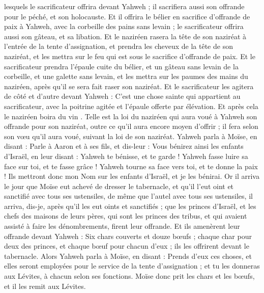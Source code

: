 \begin{multicols}{2}
lesquels le sacrificateur offrira devant Yahweh ; il sacrifiera aussi son offrande pour le péché, et son holocauste.
Et il offrira le bélier en sacrifice d'offrande de paix à Yahweh, avec la corbeille des pains sans levain ; le sacrificateur offrira aussi son gâteau, et sa libation.
Et le naziréen rasera la tête de son naziréat à l'entrée de la tente d'assignation, et prendra les cheveux de la tête de son naziréat, et les mettra sur le feu qui est sous le sacrifice d'offrande de paix.
Et le sacrificateur prendra l'épaule cuite du bélier, et un gâteau sans levain de la corbeille, et une galette sans levain, et les mettra sur les paumes des mains du naziréen, après qu'il se sera fait raser son naziréat.
Et le sacrificateur les agitera de côté et d'autre devant Yahweh : C'est une chose sainte qui appartient au sacrificateur, avec la poitrine agitée et l'épaule offerte par élévation. Et après cela le naziréen boira du vin
.
Telle est la loi du naziréen qui aura voué à Yahweh son offrande pour son naziréat, outre ce qu'il aura encore moyen d'offrir ; il fera selon son vœu qu'il aura voué, suivant la loi de son naziréat.
Yahweh parla à Moïse, en disant :
Parle à Aaron et à ses fils, et dis-leur : Vous bénirez ainsi les enfants d'Israël, en leur disant :
Yahweh te bénisse, et te garde !
Yahweh fasse luire sa face sur toi, et te fasse grâce !
Yahweh tourne sa face vers toi, et te donne la paix !
Ils mettront donc mon Nom sur les enfants d'Israël, et je les bénirai.
\VerseOne{}Or il arriva le jour que Moïse eut achevé de dresser le tabernacle, et qu'il l'eut oint et sanctifié avec tous ses ustensiles, de même que l'autel avec tous ses ustensiles, il arriva, dis-je, après qu'il les eut oints et sanctifiés ;
que les princes d'Israël, et les chefs des maisons de leurs pères, qui sont les princes des tribus, et qui avaient assisté à faire les dénombrements, firent leur offrande.
Et ils amenèrent leur offrande devant Yahweh : Six chars couverts et douze bœufs ; chaque char pour deux des princes, et chaque bœuf pour chacun d'eux ; ils les offrirent devant le tabernacle.
Alors Yahweh parla à Moïse, en disant :
Prends d'eux ces choses, et elles seront employées pour le service de la tente d'assignation ; et tu les donneras aux Lévites, à chacun selon ses fonctions.
Moïse donc prit les chars et les bœufs, et il les remit aux Lévites.

\end{multicols}
